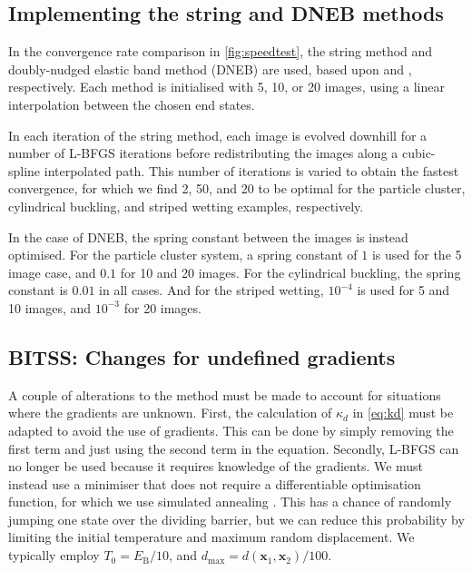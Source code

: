 \documentclass[twocolumn,10pt]{revtex4}
\newcommand{\bm}[1]{\boldsymbol{\mathbf{#1}}}
\begin{document}
\subsection{Implementing the string and DNEB methods}
In the convergence rate comparison in \cref{fig:speedtest}, the string method and doubly-nudged elastic band method (DNEB) are used, based upon \cite{E2007} and \cite{Trygubenko2004}, respectively.
Each method is initialised with 5, 10, or 20 images, using a linear interpolation between the chosen end states.

In each iteration of the string method, each image is evolved downhill for a number of L-BFGS iterations before redistributing the images along a cubic-spline interpolated path.
This number of iterations is varied to obtain the fastest convergence, for which we find 2, 50, and 20 to be optimal for the particle cluster, cylindrical buckling, and striped wetting examples, respectively.

In the case of DNEB, the spring constant between the images is instead optimised.
For the particle cluster system, a spring constant of $1$ is used for the 5 image case, and $0.1$ for 10 and 20 images.
For the cylindrical buckling, the spring constant is $0.01$ in all cases.
And for the striped wetting, $10^{-4}$ is used for 5 and 10 images, and $10^{-3}$ for 20 images.

\subsection{BITSS: Changes for undefined gradients}
A couple of alterations to the method must be made to account for situations where the gradients are unknown.
First, the calculation of $\kappa_d$ in \cref{eq:kd} must be adapted to avoid the use of gradients.
This can be done by simply removing the first term and just using the second term in the equation.
Secondly, L-BFGS can no longer be used because it requires knowledge of the gradients.
We must instead use a minimiser that does not require a differentiable optimisation function, for which we use simulated annealing \cite{Kirkpatrick1983}.
This has a chance of randomly jumping one state over the dividing barrier, but we can reduce this probability by limiting the initial temperature and maximum random displacement.
We typically employ $T_0 = E_\mathrm{B} / 10$, and $d_\mathrm{max} = d(\bm{x}_1, \bm{x}_2) / 100$.
\end{document}
